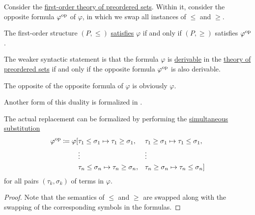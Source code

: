 \begin{theorem}\label{thm:preorder_duality}
  Consider the \hyperref[def:preordered_set/theory]{first-order theory of preordered sets}. Within it, consider the opposite formula \( \varphi^{\operatorname{op}} \) of \( \varphi \), in which we swap all instances of \( \leq \) and \( \geq \).

  The first-order structure \( (P, \leq) \) \hyperref[def:first_order_model]{satisfies} \( \varphi \) if and only if \( (P, \geq) \) satisfies \( \varphi^{\operatorname{op}} \).
\end{theorem}
\begin{comments}
  \item The weaker syntactic statement is that the formula \( \varphi \) is \hyperref[def:proof_derivability]{derivable} in the \hyperref[def:preordered_set/theory]{theory of preordered sets} if and only if the opposite formula \( \varphi^{\operatorname{op}} \) is also derivable.

  \item The opposite of the opposite formula of \( \varphi \) is obviously \( \varphi \).

  \item Another form of this duality is formalized in .

  \item The actual replacement can be formalized by performing the \hyperref[def:first_order_substitution/term_in_formula]{simultaneous substitution}
  \begin{equation*}
    \begin{aligned}
      \varphi^{\operatorname{op}} \coloneqq \varphi[
        &\tau_1 \leq \sigma_1 \mapsto \tau_1 \geq \sigma_1, &&\tau_1 \geq \sigma_1 \mapsto \tau_1 \leq \sigma_1, \\
        &\vdots                                       &&\vdots \\
        &\tau_n \leq \sigma_n \mapsto \tau_n \geq \sigma_n, &&\tau_n \geq \sigma_n \mapsto \tau_n \leq \sigma_n]
    \end{aligned}
  \end{equation*}
  for all pairs \( (\tau_k, \sigma_k) \) of terms in \( \varphi \).
\end{comments}
\begin{proof}
  Note that the semantics of \( \leq \) and \( \geq \) are swapped along with the swapping of the corresponding symbols in the formulas.
\end{proof}

